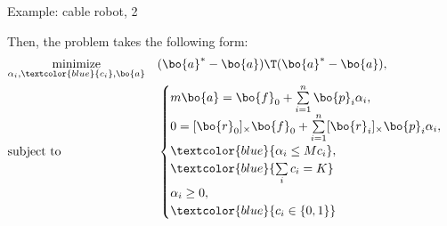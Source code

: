 \documentclass{beamer}
\begin{document}
\begin{frame}{Example: cable robot, 2}
	\begin{flushleft}
		
		Then, the problem takes the following form:
		\begin{equation}
			\begin{aligned}
				& \underset{\alpha_i, \textcolor{blue}{c_i} , \bo{a}}{\text{minimize}}
				& & (\bo{a}^* - \bo{a})\T (\bo{a}^* - \bo{a}), 
				\\
				& \text{subject to}
				& & \begin{cases}
					m \bo{a} = \bo{f}_0 + \sum\limits_{i = 1}^{n} \bo{p}_i \alpha_i,
					\\
					0 = [\bo{r}_0]_\times \bo{f}_0 + \sum\limits_{i = 1}^{n} [\bo{r}_i]_\times \bo{p}_i \alpha_i,
					\\
					\textcolor{blue}{\alpha_i \leq M c_i},
					\\
					\textcolor{blue}{\sum\limits_i c_i = K}
					\\
					\alpha_i \geq 0,
					\\
					\textcolor{blue}{c_i \in \{0, 1\}}
				\end{cases}
			\end{aligned}
		\end{equation}
		
		
	\end{flushleft}
\end{frame}




\myqrframe
\end{document}
